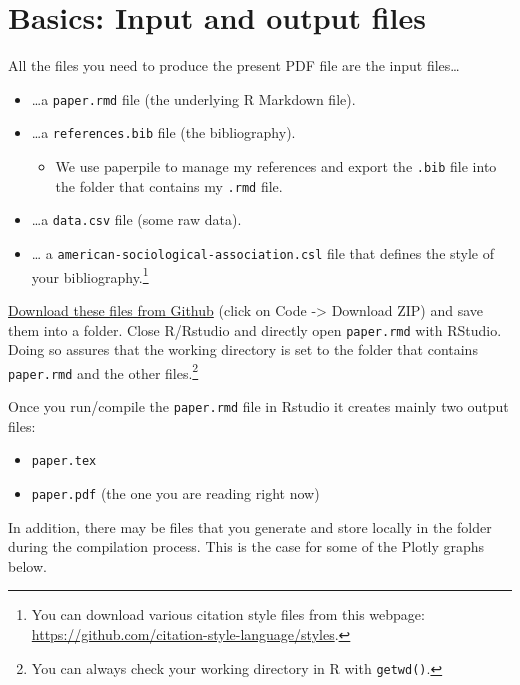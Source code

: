 \documentclass[
  12pt,
]{article}
\providecommand{\tightlist}{%
  \setlength{\itemsep}{0pt}\setlength{\parskip}{0pt}}
\begin{document}
\hypertarget{basics-input-and-output-files}{%
\section{Basics: Input and output
files}\label{basics-input-and-output-files}}

All the files you need to produce the present PDF file are the input
files\ldots{}

\begin{itemize}
\tightlist
\item
  \ldots a \texttt{paper.rmd} file (the underlying R Markdown file).
\item
  \ldots a \texttt{references.bib} file (the bibliography).

  \begin{itemize}
  \tightlist
  \item
    We use paperpile to manage my references and export the
    \texttt{.bib} file into the folder that contains my \texttt{.rmd}
    file.
  \end{itemize}
\item
  \ldots a \texttt{data.csv} file (some raw data).
\item
  \ldots{} a \texttt{american-sociological-association.csl} file that
  defines the style of your bibliography.\footnote{You can download
    various citation style files from this webpage:
    \url{https://github.com/citation-style-language/styles}.}
\end{itemize}

\href{https://github.com/paulcbauer/Writing_a_reproducable_paper_in_rmarkdown}{Download
these files from Github} (click on Code -\textgreater{} Download ZIP)
and save them into a folder. Close R/Rstudio and directly open
\texttt{paper.rmd} with RStudio. Doing so assures that the working
directory is set to the folder that contains \texttt{paper.rmd} and the
other files.\footnote{You can always check your working directory in R
  with \texttt{getwd()}.}

Once you run/compile the \texttt{paper.rmd} file in Rstudio it creates
mainly two output files:

\begin{itemize}
\tightlist
\item
  \texttt{paper.tex}
\item
  \texttt{paper.pdf} (the one you are reading right now)
\end{itemize}

In addition, there may be files that you generate and store locally in
the folder during the compilation process. This is the case for some of
the Plotly graphs below.
\end{document}
